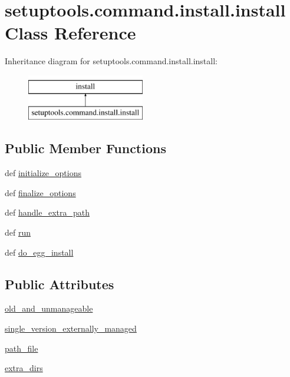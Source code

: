 \hypertarget{classsetuptools_1_1command_1_1install_1_1install}{}\section{setuptools.\+command.\+install.\+install Class Reference}
\label{classsetuptools_1_1command_1_1install_1_1install}
Inheritance diagram for setuptools.\+command.\+install.\+install\+:\begin{figure}[H]
\begin{center}
\leavevmode
\includegraphics[height=2.000000cm]{classsetuptools_1_1command_1_1install_1_1install}
\end{center}
\end{figure}
\subsection*{Public Member Functions}
\begin{DoxyCompactItemize}
\item 
def \hyperlink{classsetuptools_1_1command_1_1install_1_1install_acdf0557fd926689f91222ac7c8adfff8}{initialize\+\_\+options}
\item 
def \hyperlink{classsetuptools_1_1command_1_1install_1_1install_a16cd5662a76f1d45a3741c8cbf112182}{finalize\+\_\+options}
\item 
def \hyperlink{classsetuptools_1_1command_1_1install_1_1install_a55f59f11b9c02eff9ad940bcaff090ef}{handle\+\_\+extra\+\_\+path}
\item 
def \hyperlink{classsetuptools_1_1command_1_1install_1_1install_af55f027b0a668cf81bd343448aeab5c2}{run}
\item 
def \hyperlink{classsetuptools_1_1command_1_1install_1_1install_af714fd20244c5a2f6e2d03c7186ab3ba}{do\+\_\+egg\+\_\+install}
\end{DoxyCompactItemize}
\subsection*{Public Attributes}
\begin{DoxyCompactItemize}
\item 
\hyperlink{classsetuptools_1_1command_1_1install_1_1install_ad632056e38380043f49eaf7eabbe08a5}{old\+\_\+and\+\_\+unmanageable}
\item 
\hyperlink{classsetuptools_1_1command_1_1install_1_1install_a7a20443140985362c236e68aca2f8f55}{single\+\_\+version\+\_\+externally\+\_\+managed}
\item 
\hyperlink{classsetuptools_1_1command_1_1install_1_1install_a511be215285c366911de400d05cbecb8}{path\+\_\+file}
\item 
\hyperlink{classsetuptools_1_1command_1_1install_1_1install_a5cc3711524f10b2e6c261bd50a975ef4}{extra\+\_\+dirs}
\end{DoxyCompactItemize}

